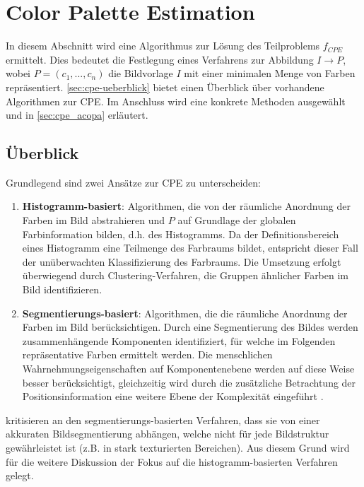 
\section{Color Palette Estimation}
\label{sec:cpe}

In diesem Abschnitt wird eine Algorithmus zur Lösung des Teilproblems $f_{CPE}$ ermittelt. Dies bedeutet die Festlegung eines Verfahrens zur Abbildung $I \to P$, wobei $P = (c_1, ..., c_n)$ die Bildvorlage $I$ mit einer minimalen Menge von Farben repräsentiert. \autoref{sec:cpe-ueberblick} bietet einen Überblick über vorhandene Algorithmen zur CPE. Im Anschluss wird  eine konkrete Methoden ausgewählt und in \autoref{sec:cpe_acopa} erläutert.

\subsection{Überblick}
\label{sec:cpe-ueberblick}

Grundlegend sind zwei Ansätze zur CPE zu unterscheiden:
\begin{enumerate}
    \item \textbf{Histogramm-basiert}: Algorithmen, die von der räumliche Anordnung der Farben im Bild abstrahieren und $P$ auf Grundlage der globalen Farbinformation bilden, d.h. des Histogramms. Da der Definitionsbereich eines Histogramm eine Teilmenge des Farbraums bildet, entspricht dieser Fall der unüberwachten Klassifizierung des Farbraums. Die Umsetzung erfolgt überwiegend durch Clustering-Verfahren, die Gruppen ähnlicher Farben im Bild identifizieren.
    \item \textbf{Segmentierungs-basiert}: Algorithmen, die die räumliche Anordnung der Farben im Bild berücksichtigen. Durch eine Segmentierung des Bildes werden zusammenhängende Komponenten identifiziert, für welche im Folgenden repräsentative Farben ermittelt werden. Die menschlichen Wahrnehmungseigenschaften auf Komponentenebene werden auf diese Weise besser berücksichtigt, gleichzeitig wird durch die zusätzliche Betrachtung der Positionsinformation eine weitere Ebene der Komplexität eingeführt \citep{colorthemes}.
\end{enumerate}

\citet{image-based-schemes} kritisieren an den segmentierungs-basierten Verfahren, dass sie von einer akkuraten Bildsegmentierung abhängen, welche nicht für jede Bildstruktur gewährleistet ist (z.B. in stark texturierten Bereichen). Aus diesem Grund wird für die weitere Diskussion der Fokus auf die histogramm-basierten Verfahren gelegt.

